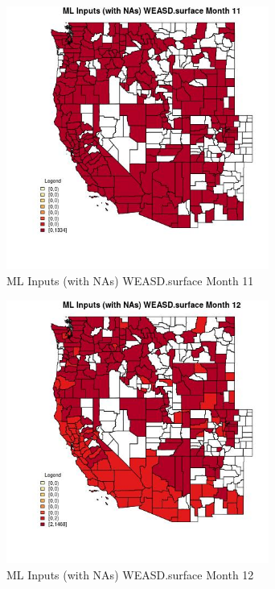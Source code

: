 \begin{figure} 
\centering  
\includegraphics[width=0.77\textwidth]{Code_Outputs/Report_ML_input_PM25_Step4_part_e_de_duplicated_aves_compiled_2019-05-21wNAs_CountyWEASDsurfacemedianMonth11.jpg} 
\caption{\label{fig:Report_ML_input_PM25_Step4_part_e_de_duplicated_aves_compiled_2019-05-21wNAsCountyWEASDsurfacemedianMonth11}ML Inputs (with NAs) WEASD.surface Month 11} 
\end{figure} 
 

\begin{figure} 
\centering  
\includegraphics[width=0.77\textwidth]{Code_Outputs/Report_ML_input_PM25_Step4_part_e_de_duplicated_aves_compiled_2019-05-21wNAs_CountyWEASDsurfacemedianMonth12.jpg} 
\caption{\label{fig:Report_ML_input_PM25_Step4_part_e_de_duplicated_aves_compiled_2019-05-21wNAsCountyWEASDsurfacemedianMonth12}ML Inputs (with NAs) WEASD.surface Month 12} 
\end{figure} 
 

